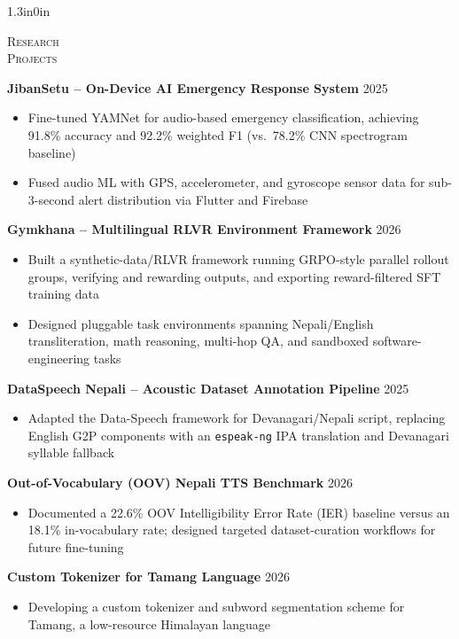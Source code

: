 \documentclass[11pt]{article}
\newcommand{\cvlabel}[1]{\hspace*{-1.3in}\parbox[t][\baselineskip][t]{1.05in}{\raggedright\scshape #1\par}\hspace{0.25in}}
\newenvironment{cvsection}[1]{%
  \begin{adjustwidth}{1.3in}{0in}\noindent\cvlabel{#1}%
}{%
  \end{adjustwidth}\vspace{10pt}
}
\begin{document}
\begin{cvsection}{Research\\Projects}
\textbf{JibanSetu -- On-Device AI Emergency Response System} \hfill 2025
\begin{itemize}
  \item Fine-tuned YAMNet for audio-based emergency classification, achieving 91.8\% accuracy and 92.2\% weighted F1 (vs.\ 78.2\% CNN spectrogram baseline)
  \item Fused audio ML with GPS, accelerometer, and gyroscope sensor data for sub-3-second alert distribution via Flutter and Firebase
\end{itemize}

\textbf{Gymkhana -- Multilingual RLVR Environment Framework} \hfill 2026
\begin{itemize}
  \item Built a synthetic-data/RLVR framework running GRPO-style parallel rollout groups, verifying and rewarding outputs, and exporting reward-filtered SFT training data
  \item Designed pluggable task environments spanning Nepali/English transliteration, math reasoning, multi-hop QA, and sandboxed software-engineering tasks
\end{itemize}

\textbf{DataSpeech Nepali -- Acoustic Dataset Annotation Pipeline} \hfill 2025
\begin{itemize}
  \item Adapted the Data-Speech framework for Devanagari/Nepali script, replacing English G2P components with an \texttt{espeak-ng} IPA translation and Devanagari syllable fallback
\end{itemize}

\textbf{Out-of-Vocabulary (OOV) Nepali TTS Benchmark} \hfill 2026
\begin{itemize}
  \item Documented a 22.6\% OOV Intelligibility Error Rate (IER) baseline versus an 18.1\% in-vocabulary rate; designed targeted dataset-curation workflows for future fine-tuning
\end{itemize}

\textbf{Custom Tokenizer for Tamang Language} \hfill 2026
\begin{itemize}
  \item Developing a custom tokenizer and subword segmentation scheme for Tamang, a low-resource Himalayan language
\end{itemize}
\end{cvsection}
\end{document}
